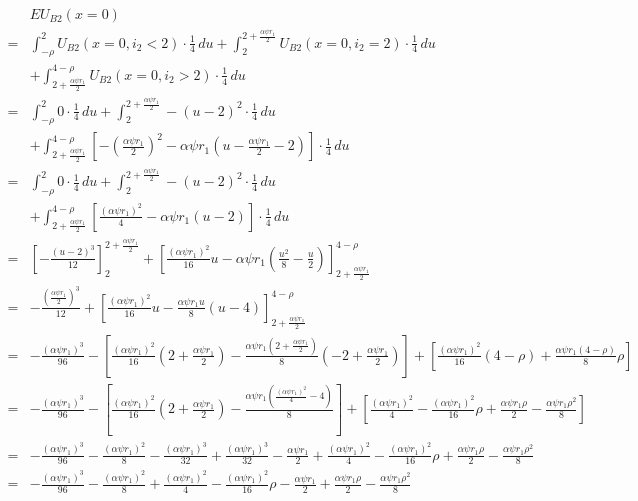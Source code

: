 \documentclass[
  a4paper,
  abstract=true]{scrartcl}
\theoremstyle{definition}
\begin{document}
\begin{align*}
&EU_{B2}(x=0) \\
=&\int_{-\rho}^{2} U_{B2}(x=0,i_2<2) \cdot\frac{1}{4} \, du+ \int_{2}^{2+\frac{\alpha\psi r_1}{2}} U_{B2}(x=0,i_2=2) \cdot \frac{1}{4} \, du \\&+ \int_{2+\frac{\alpha\psi r_1}{2}}^{4-\rho} U_{B2}(x=0,i_2>2) \cdot \frac{1}{4} \, du\\
=&\int_{-\rho}^{2}0 \cdot \frac{1}{4} \, du+ \int_{2}^{2+\frac{\alpha\psi r_1}{2}}-(u-2)^2 \cdot \frac{1}{4} \, du \\&+ \int_{2+\frac{\alpha\psi r_1}{2}}^{4-\rho}[-(\frac{\alpha\psi r_1}{2})^2-\alpha\psi r_1(u-\frac{\alpha\psi r_1}{2}-2)] \cdot \frac{1}{4} \, du\\
=&\int_{-\rho}^{2}0 \cdot \frac{1}{4} \, du+ \int_{2}^{2+\frac{\alpha\psi r_1}{2}}-(u-2)^2 \cdot \frac{1}{4} \, du \\&+ \int_{2+\frac{\alpha\psi r_1}{2}}^{4-\rho}[\frac{(\alpha\psi r_1)^2}{4}-\alpha\psi r_1(u-2)] \cdot \frac{1}{4} \, du\\
=&[-\frac{(u-2)^3}{12}]_{2}^{2+\frac{\alpha\psi r_1}{2}}+[\frac{(\alpha\psi r_1)^2}{16}u-\alpha\psi r_1(\frac{u^2}{8}-\frac{u}{2})]_{2+\frac{\alpha\psi r_1}{2}}^{4-\rho}\\
=&-\frac{(\frac{\alpha\psi r_1}{2})^3}{12}+[\frac{(\alpha\psi r_1)^2}{16}u-\frac{\alpha\psi r_1 u}{8}(u-4)]_{2+\frac{\alpha\psi r_1}{2}}^{4-\rho}\\
=&-\frac{(\alpha\psi r_1)^3}{96}-[\frac{(\alpha\psi r_1)^2}{16}(2+\frac{\alpha\psi r_1}{2})-\frac{\alpha\psi r_1(2+\frac{\alpha\psi r_1}{2})}{8}(-2+\frac{\alpha\psi r_1}{2})]+[\frac{(\alpha\psi r_1)^2}{16}(4-\rho)+\frac{\alpha\psi r_1(4-\rho)}{8}\rho]\\
=&-\frac{(\alpha\psi r_1)^3}{96}-[\frac{(\alpha\psi r_1)^2}{16}(2+\frac{\alpha\psi r_1}{2})-\frac{\alpha\psi r_1(\frac{(\alpha\psi r_1)^2}{4}-4)}{8}]+[\frac{(\alpha\psi r_1)^2}{4}-\frac{(\alpha\psi r_1)^2}{16}\rho+\frac{\alpha\psi r_1 \rho}{2}-\frac{\alpha\psi r_1 \rho^2}{8}]\\
=&-\frac{(\alpha\psi r_1)^3}{96}-\frac{(\alpha\psi r_1)^2}{8}-\frac{(\alpha\psi r_1)^3}{32}+\frac{(\alpha\psi r_1)^3}{32}-\frac{\alpha\psi r_1}{2}+\frac{(\alpha\psi r_1)^2}{4}-\frac{(\alpha\psi r_1)^2}{16}\rho+\frac{\alpha\psi r_1 \rho}{2}-\frac{\alpha\psi r_1 \rho^2}{8}\\
=&-\frac{(\alpha\psi r_1)^3}{96}-\frac{(\alpha\psi r_1)^2}{8}+\frac{(\alpha\psi r_1)^2}{4}-\frac{(\alpha\psi r_1)^2}{16}\rho-\frac{\alpha\psi r_1}{2}+\frac{\alpha\psi r_1 \rho}{2}-\frac{\alpha\psi r_1 \rho^2}{8} \\

\end{align*}
\end{document}

